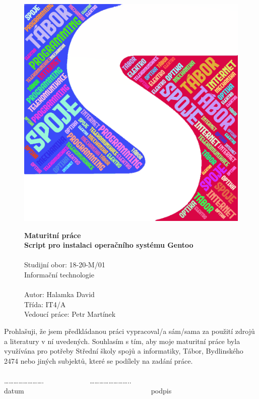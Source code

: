 \documentclass[12pt,a4paper,twoside,]{article}
\begin{document}
\begin{figure}[h!]
\centering
\includegraphics[scale=0.5,]{obrazky/sssi_logo.png}


	
\textsf{\textbf{\Huge Maturitní práce\\}}
\textsf{ \textbf{\Huge Script pro instalaci operačního systému Gentoo \\}}
\textsf{ \Huge \\Studijní obor: 18-20-M/01 \\Informační technologie\\}
\textsf{\LARGE \\Autor: Halamka David\\
Třída: IT4/A\\
Vedoucí práce: Petr Martínek
}
\end{figure}


\newpage
Prohlašuji, že jsem předkládanou práci vypracoval/a sám/sama za použití zdrojů a literatury v ní uvedených. Souhlasím s tím, aby moje maturitní práce byla využívána pro potřeby Střední školy spojů a informatiky, Tábor, Bydlinského 2474 nebo jiných subjektů, které se podílely na zadání práce.\\ 
\\	…………………….~~~~~~~~~~~~~……………………..\\
datum~~~~~~~~~~~~~~~~~~~~~~~~~~~~~~~~~~~~podpis
\end{document}
